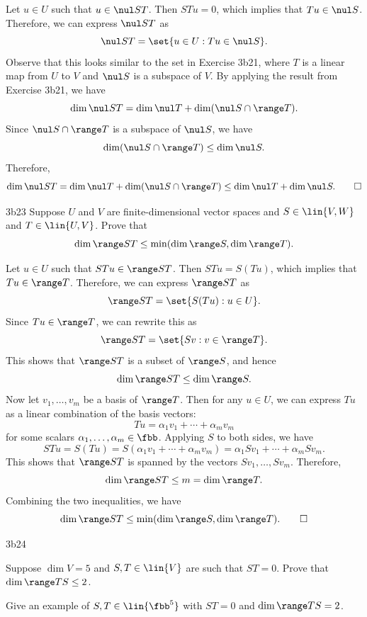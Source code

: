 \begin{sol}
    Let $u \in U$ such that $u \in \nul ST$.
	Then $STu = 0$, which implies that $Tu \in \nul S$.
	Therefore, we can express $\nul ST$ as
    \[
    	\nul ST = \set{u \in U : Tu \in \nul S}.
    \]
    Observe that this looks similar to the set in Exercise 3b21, where $T$ is a linear map from $U$ to $V$ and $\nul S$ is a subspace of $V$.
	By applying the result from Exercise 3b21, we have
    \[
    	\dim \nul ST = \dim \nul T + \dim(\nul S \cap \range T).
    \]
    Since $\nul S \cap \range T$ is a subspace of $\nul S$, we have
    \[
    	\dim(\nul S \cap \range T) \leq \dim \nul S.
    \]
    Therefore,
    \[
    	\dim \nul ST = \dim \nul T + \dim(\nul S \cap \range T) \leq \dim \nul T + \dim \nul S. \qedhere
    \]
\end{sol}

\begin{exercise}{3b23}
    Suppose $U$ and $V$ are finite-dimensional vector spaces and $S \in \lin{V, W}$ and $T \in \lin{U, V}$.
	Prove that
    \[
    	\dim \range ST \leq \min(\dim \range S, \dim \range T).
    \]
\end{exercise}

\begin{sol}
    Let $u \in U$ such that $STu \in \range ST$.
	Then $STu = S(Tu)$, which implies that $Tu \in \range T$.
	Therefore, we can express $\range ST$ as
    \[
    	\range ST = \set{S(Tu) : u \in U}.
    \]
    Since $Tu \in \range T$, we can rewrite this as
    \[
    	\range ST = \set{Sv : v \in \range T}.
    \]
    This shows that $\range ST$ is a subset of $\range S$, and hence
    \[
    	\dim \range ST \leq \dim \range S.
    \]
    Now let $v_1, \ldots, v_m$ be a basis of $\range T$.
	Then for any $u \in U$, we can express $Tu$ as a linear combination of the basis vectors:
    \[
    	Tu = \alpha_1 v_1 + \cdots + \alpha_m v_m
    \]
    for some scalars $\alpha_1, \ldots, \alpha_m \in \fbb$.
	Applying $S$ to both sides, we have
    \[
    	STu = S(Tu) = S(\alpha_1 v_1 + \cdots + \alpha_m v_m) = \alpha_1 Sv_1 + \cdots + \alpha_m Sv_m.
    \]
    This shows that $\range ST$ is spanned by the vectors $Sv_1, \ldots, Sv_m$.
	Therefore,
    \[
    	\dim \range ST \leq m = \dim \range T.
    \]
    Combining the two inequalities, we have
    \[
    	\dim \range ST \leq \min(\dim \range S, \dim \range T). \qedhere
    \]
\end{sol}

\begin{exercise}{3b24}
    \begin{subexercises}
        \item Suppose $\dim V = 5$ and $S, T \in \lin{V}$ are such that $ST = 0$.
	Prove that $\dim \range TS \leq 2$.
        \item Give an example of $S, T \in \lin{\fbb^5}$ with $ST = 0$ and $\dim \range TS = 2$.
    \end{subexercises}
\end{exercise}

